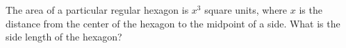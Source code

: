 The area of a particular regular hexagon is $x^3$ square units, where $x$ is the distance from the center of the hexagon to the midpoint of a side. What is the side length of the hexagon?
